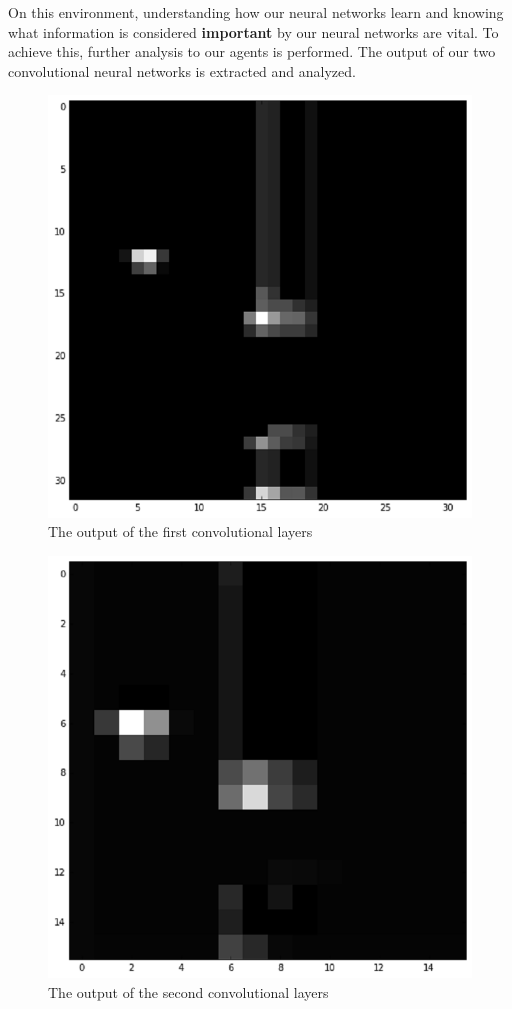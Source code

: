     \par
    On this environment, understanding how our neural networks learn and knowing what information is considered \textbf{important} by our neural networks are vital. To achieve this, further analysis to our agents is performed. The output of our two convolutional neural networks is extracted and analyzed.
      \begin{figure}[H]
            \centering
            \includegraphics[scale=0.5]{images/layer1.png}
            \caption{The output of the first convolutional layers}
            \label{fig:flappy2}
        \end{figure}
    \begin{figure}[H]
            \centering
            \includegraphics[scale=0.5]{images/layer2.png}
            \caption{The output of the second convolutional layers}
            \label{fig:flappy3}
        \end{figure}
